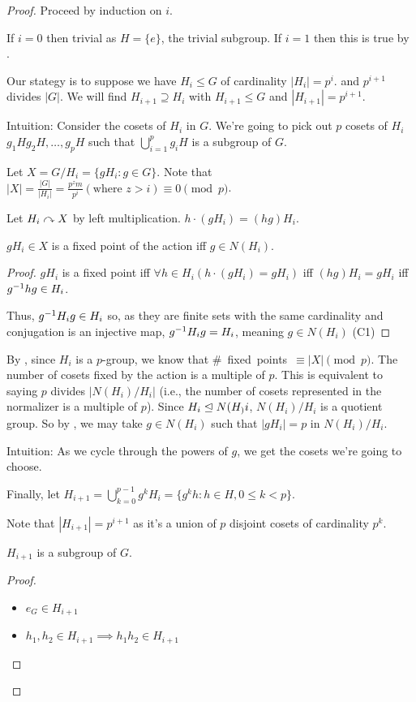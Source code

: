 \documentclass[notes.tex]{subfiles}
\begin{document}
\begin{proof}
	Proceed by induction on $i$.

	If $i=0$ then trivial as $H = \{e\}$, the trivial subgroup.
	If $i=1$ then this is true by .

	Our stategy is to suppose we have $H_i\le G$ of cardinality $|H_i| = p^i$.
	and $p^{i+1}$ divides $|G|$. We will find $H_{i+1} \supseteq H_{i}$ with $H_{i+1}\le G$ and $|H_{i+1}| = p^{i+1}$.

	Intuition: Consider the cosets of $H_i$ in $G$. We're going to pick out $p$ cosets of $H_i$ $g_1H g_2H, \ldots, g_pH$ such that $\bigcup_{i=1}^p g_iH$ is a subgroup of $G.$

	Let $X = G/H_i = \{gH_i : g\in G\}$. Note that $|X| = \frac{|G|}{|H_i|} = \frac{p^zm}{p^i} (\text{where }z > i) \equiv 0 \pmod p$.

	Let $H_i\curvearrowright X$ by left multiplication.
	$h\cdot (gH_i) = (hg)H_i$.

	\begin{claim}[1]
		$gH_i \in X$ is a fixed point of the action iff $g\in N(H_i)$.
	\end{claim}
	\begin{proof}
		$gH_i$ is a fixed point iff $\forall h\in H_i (h\cdot(gH_i) = gH_i)$
		iff $(hg)H_i = gH_i$
		iff ${g}^{-1}hg \in H_i$.

		Thus, ${g}^{-1}H_ig \in H_i$ so, as they are finite sets with the same cardinality and conjugation is an injective map, ${g}^{-1}H_ig = H_i$, meaning $g\in N(H_i)$
		\qedhere(C1)
	\end{proof}
	By , since $H_i$ is a $p$-group, we know that \#~fixed~points~$\equiv |X| \pmod p$.
	The number of cosets fixed by the action is a multiple of $p$. This is equivalent to saying $p$ divides $|N(H_i)/H_i|$ (i.e., the number of cosets represented in the normalizer is a multiple of $p$).
	Since $H_i \trianglelefteq N(H_)i$, $N(H_i)/H_i$ is a quotient group. So by , we may take $g\in N(H_i)$ such that $|gH_i| = p$ in $N(H_i)/H_i$.

	Intuition: As we cycle through the powers of $g$, we get the cosets we're going to choose.

	Finally, let $H_{i+1} = \bigcup_{k=0}^{p-1} g^kH_i = \{g^kh:h\in H, 0\le k < p\}$.

	Note that $|H_{i+1}| = p^{i+1}$ as it's a union of $p$ disjoint cosets of cardinality $p^k$.

	\begin{claim}[2]
		$H_{i+1}$ is a subgroup of $G$.
	\end{claim}
	\begin{proof}\leavevmode
	\begin{itemize}
		\item $e_G\in H_{i+1}$ 
		\item $h_1, h_2\in H_{i+1} \implies h_1h_2\in H_{i+1}$


\end{itemize}
\end{proof}
\end{proof}
\end{document}
